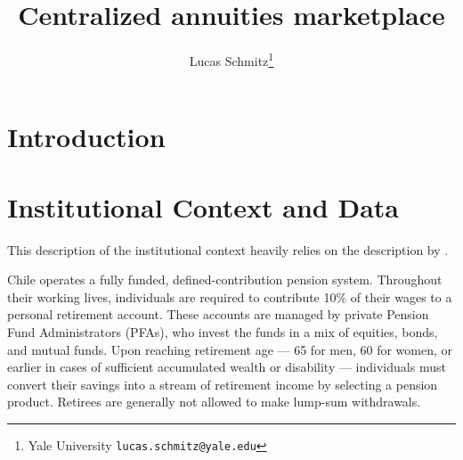\documentclass[12pt]{article}
\theoremstyle{plain}
\theoremstyle{plain}
\begin{document}
 

\newpage
 \title{{\Large Centralized annuities marketplace}}
\author{Lucas Schmitz\thanks{Yale University \texttt{lucas.schmitz@yale.edu}}} 
\date{}
\maketitle


%



\vspace{3cm}


\begin{abstract}
\end{abstract}

\vspace{2cm}
\section{Introduction}




\section{Institutional Context and Data}\label{sec: context and data}

 This description of the institutional context heavily relies on the description by \textcite{boehm_intermediation_2024}.

Chile operates a fully funded, defined-contribution pension system. Throughout their working lives, individuals are required to contribute 10\% of their wages to a personal retirement account. These accounts are managed by private Pension Fund Administrators (PFAs), who invest the funds in a mix of equities, bonds, and mutual funds. Upon reaching retirement age — 65 for men, 60 for women, or earlier in cases of sufficient accumulated wealth or disability — individuals must convert their savings into a stream of retirement income by selecting a pension product. Retirees are generally not allowed to make lump-sum withdrawals.
\end{document}

